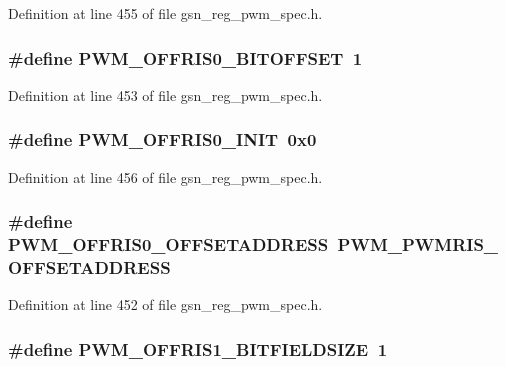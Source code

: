 Definition at line 455 of file gsn\_\-reg\_\-pwm\_\-spec.h.

\hypertarget{a00565_a581825b5d80790f432ee8d6d5ed5c332}{
\subsubsection[{PWM\_\-OFFRIS0\_\-BITOFFSET}]{\setlength{\rightskip}{0pt plus 5cm}\#define PWM\_\-OFFRIS0\_\-BITOFFSET~1}}
\label{a00565_a581825b5d80790f432ee8d6d5ed5c332}


Definition at line 453 of file gsn\_\-reg\_\-pwm\_\-spec.h.

\hypertarget{a00565_a4cbdf9fba3e2a20e873357d3ccc9c1a0}{
\subsubsection[{PWM\_\-OFFRIS0\_\-INIT}]{\setlength{\rightskip}{0pt plus 5cm}\#define PWM\_\-OFFRIS0\_\-INIT~0x0}}
\label{a00565_a4cbdf9fba3e2a20e873357d3ccc9c1a0}


Definition at line 456 of file gsn\_\-reg\_\-pwm\_\-spec.h.

\hypertarget{a00565_ab4f4c6a7031c6cc75825ce5331678457}{
\subsubsection[{PWM\_\-OFFRIS0\_\-OFFSETADDRESS}]{\setlength{\rightskip}{0pt plus 5cm}\#define PWM\_\-OFFRIS0\_\-OFFSETADDRESS~PWM\_\-PWMRIS\_\-OFFSETADDRESS}}
\label{a00565_ab4f4c6a7031c6cc75825ce5331678457}


Definition at line 452 of file gsn\_\-reg\_\-pwm\_\-spec.h.

\hypertarget{a00565_a5fc0ddbfdc56442808b5de93ccd40fa0}{
\subsubsection[{PWM\_\-OFFRIS1\_\-BITFIELDSIZE}]{\setlength{\rightskip}{0pt plus 5cm}\#define PWM\_\-OFFRIS1\_\-BITFIELDSIZE~1}}
\label{a00565_a5fc0ddbfdc56442808b5de93ccd40fa0}


